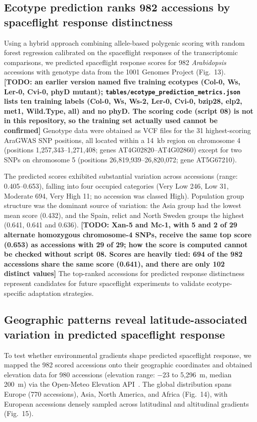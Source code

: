 \documentclass[sn-mathphys-num,Basic]{sn-jnl}
\begin{document}
\subsection{Ecotype prediction ranks 982 accessions by spaceflight response distinctness}

Using a hybrid approach combining allele-based polygenic scoring with random forest regression calibrated on the spaceflight responses of the transcriptomic comparisons, we predicted spaceflight response scores for 982 \textit{Arabidopsis} accessions with genotype data from the 1001 Genomes Project (Fig.~13). \textbf{[TODO: an earlier version named five training ecotypes (Col-0, Ws, Ler-0, Cvi-0, phyD mutant); \texttt{tables/ecotype\_prediction\_metrics.json} lists ten training labels (Col-0, Ws, Ws-2, Ler-0, Cvi-0, bzip28, elp2, met1, Wild.Type, all) and no phyD. The scoring code (script 08) is not in this repository, so the training set actually used cannot be confirmed]} Genotype data were obtained as VCF files for the 31 highest-scoring AraGWAS SNP positions, all located within a 14~kb region on chromosome 4 (positions 1,257,343--1,271,408; genes AT4G02820--AT4G02860) except for two SNPs on chromosome 5 (positions 26,819,939--26,820,072; gene AT5G67210).

The predicted scores exhibited substantial variation across accessions (range: 0.405--0.653), falling into four occupied categories (Very Low 246, Low 31, Moderate 694, Very High 11; no accession was classed High). Population group structure was the dominant source of variation: the Asia group had the lowest mean score (0.432), and the Spain, relict and North Sweden groups the highest (0.641, 0.641 and 0.636). \textbf{[TODO: Xan-5 and Mc-1, with 5 and 2 of 29 alternate homozygous chromosome-4 SNPs, receive the same top score (0.653) as accessions with 29 of 29; how the score is computed cannot be checked without script 08. Scores are heavily tied: 694 of the 982 accessions share the same score (0.641), and there are only 102 distinct values]} The top-ranked accessions for predicted response distinctness represent candidates for future spaceflight experiments to validate ecotype-specific adaptation strategies.

\subsection{Geographic patterns reveal latitude-associated variation in predicted spaceflight response}

To test whether environmental gradients shape predicted spaceflight response, we mapped the 982 scored accessions onto their geographic coordinates and obtained elevation data for 980 accessions (elevation range: $-23$ to 5,296~m, median 200~m) via the Open-Meteo Elevation API~\cite{OpenMeteo2024}. The global distribution spans Europe (770 accessions), Asia, North America, and Africa (Fig.~14), with European accessions densely sampled across latitudinal and altitudinal gradients (Fig.~15).
\end{document}
